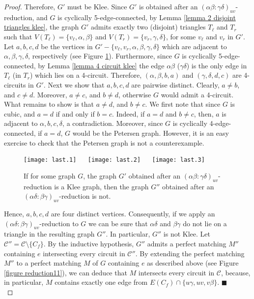 \documentclass[]{theclass}
\begin{document}
\begin{proof}
Therefore, $G'$ must be Klee. Since $G'$ is obtained after an $(\alpha\beta:\gamma\delta)_{uv}$-reduction, and $G$ is cyclically 5-edge-connected, by Lemma \ref{lemma 2 disjoint triangles klee}, the graph $G'$ admits exactly two (disjoint) triangles $T_{\ell}$ and $T_{r}$ such that $V(T_{\ell})=\{v_{\ell},\alpha,\beta\}$ and $V(T_{r})=\{v_{r},\gamma,\delta\}$, for some $v_{\ell}$ and $v_{r}$ in $G'$. Let $a,b,c,d$ be the vertices in $G'-\{v_{\ell},v_{r}, \alpha,\beta, \gamma,\delta\}$ which are adjacent to $\alpha,\beta,\gamma,\delta$, respectively (see Figure \ref{fig:toPetersen}). Furthermore, since $G$ is cyclically 5-edge-connected, by Lemma \ref{lemma 4 circuit klee} the edge $\alpha\beta$ ($\gamma\delta$) is the only edge in $T_{\ell}$ (in $T_{r}$) which lies on a 4-circuit. Therefore, $(\alpha,\beta,b,a)$ and $(\gamma,\delta, d, c)$ are 4-circuits in $G'$. Next we show that $a,b,c,d$ are pairwise distinct. Clearly, $a\neq b$, and $c\neq d$. Moreover, $a\neq c$, and $b\neq d$, otherwise $G$ would admit a 4-circuit. What remains to show is that $a\neq d$, and $b\neq c$. We first note that since $G$ is cubic, and $a=d$ if and only if $b=c$. Indeed, if $a=d$ and $b\neq c$, then, $a$ is adjacent to $\alpha, b, c, \delta$, a contradiction. Moreover, since $G$ is cyclically 4-edge-connected, if $a=d$, $G$ would be the Petersen graph. However, it is an easy exercise to check that the Petersen graph is not a counterexample.

\begin{figure}[ht]
    \centering
    \texttt{[image: last.1]} $\quad$
    \texttt{[image: last.2]} $\quad$
    \texttt{[image: last.3]}
    \caption{If for some graph $G$, the graph $G'$ obtained after an $(\alpha\beta:\gamma\delta)_{uv}$-reduction is a Klee graph, then the graph $G''$ obtained after an $(\alpha\delta:\beta\gamma)_{uv}$-reduction is not.}
    \label{fig:toPetersen}
\end{figure}
Hence, $a,b,c,d$ are four distinct vertices. Consequently, if we apply an $(\alpha\delta:\beta\gamma)_{uv}$-reduction to $G$ we can be sure that $\alpha\delta$ and $\beta\gamma$ do not lie on a triangle in the resulting graph $G''$. In particular, $G''$ is not Klee. 
Let $\mathcal{C}''=\mathcal{C}\setminus \{C_f\}$. By the inductive hypothesis, $G''$ admits a perfect matching $M''$ containing $e$ intersecting every circuit in $\mathcal{C}''$.
By extending the perfect matching $M''$ to a perfect matching $M$ of $G$ containing $e$ as described above (see Figure \ref{figure reduction11}), we can deduce that $M$ intersects every circuit in $\mathcal{C}$, because, in particular, $M$ contains exactly one edge from $E(C_f)\cap \{u\gamma, uv, v\beta\}$. \hfill {\tiny$\blacksquare$}\\


\end{proof}
\end{document}
